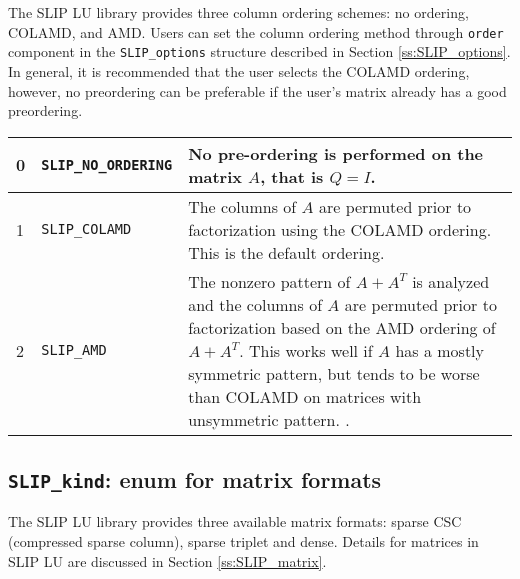 \documentclass[12pt]{article}
\theoremstyle{definition}
\begin{document}
The SLIP LU library provides three column ordering schemes: no ordering,
COLAMD, and AMD. Users can set the column ordering method through \verb|order|
component in the \verb|SLIP_options| structure described in Section
\ref{ss:SLIP_options}. In general, it is recommended that the user selects the
COLAMD ordering, however, no preordering can be preferable if the user's matrix
already has a good preordering.

{\small
\begin{center}
\begin{tabular}{llp{4in}}
\hline
0 & \verb|SLIP_NO_ORDERING| & No pre-ordering is performed on the matrix $A$,
                              that is $Q = I$. \\
\hline
1 & \verb|SLIP_COLAMD|      & The columns of $A$ are permuted prior to
                              factorization using the COLAMD
                              \cite{davis2004algorithmcolamd} ordering.
                              This is the default ordering. \\
\hline
2 & \verb|SLIP_AMD|         & The nonzero pattern of $A + A^T$ is analyzed and
                              the columns of $A$ are permuted prior to
                              factorization based on the AMD
                              \cite{amestoy2004algorithmamd} ordering of
                              $A+A^T$. This works well if $A$ has a mostly
                              symmetric pattern, but tends to be worse
                              than COLAMD on matrices with unsymmetric pattern.
                              \cite{davis2004column}.\\
\hline
\end{tabular}
\label{tab:SLIP_pivot}
\end{center}
}

\cprotect\subsection{\verb|SLIP_kind|: enum for matrix formats}
\label{ss:SLIP_kind}

The SLIP LU library provides three available matrix formats: sparse CSC
(compressed sparse column), sparse triplet and dense. Details for matrices in
SLIP LU are discussed in Section \ref{ss:SLIP_matrix}.
\end{document}
